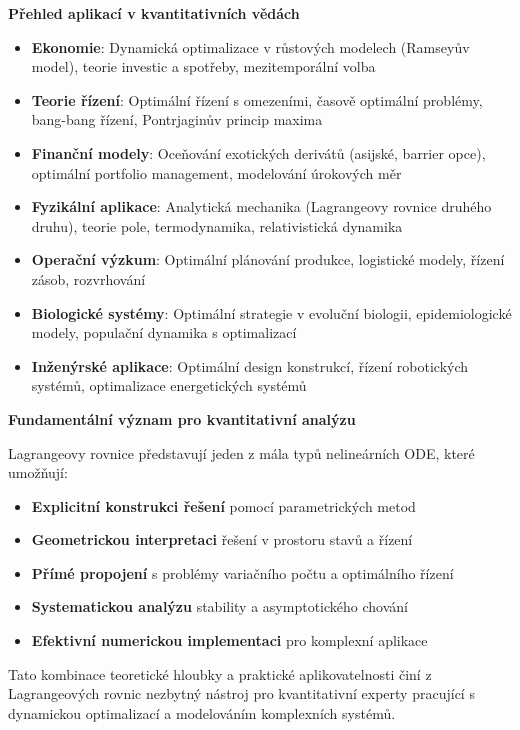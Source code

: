 \vspace{1\baselineskip}

\noindent\textbf{Přehled aplikací v kvantitativních vědách}

\begin{itemize}
\item \textbf{Ekonomie}: Dynamická optimalizace v růstových modelech (Ramseyův model), teorie investic a spotřeby, mezitemporální volba
\item \textbf{Teorie řízení}: Optimální řízení s omezeními, časově optimální problémy, bang-bang řízení, Pontrjaginův princip maxima
\item \textbf{Finanční modely}: Oceňování exotických derivátů (asijské, barrier opce), optimální portfolio management, modelování úrokových měr
\item \textbf{Fyzikální aplikace}: Analytická mechanika (Lagrangeovy rovnice druhého druhu), teorie pole, termodynamika, relativistická dynamika
\item \textbf{Operační výzkum}: Optimální plánování produkce, logistické modely, řízení zásob, rozvrhování
\item \textbf{Biologické systémy}: Optimální strategie v evoluční biologii, epidemiologické modely, populační dynamika s optimalizací
\item \textbf{Inženýrské aplikace}: Optimální design konstrukcí, řízení robotických systémů, optimalizace energetických systémů
\end{itemize}

\vspace{1\baselineskip}

\noindent\textbf{Fundamentální význam pro kvantitativní analýzu}

Lagrangeovy rovnice představují jeden z mála typů nelineárních ODE, které umožňují:
\begin{itemize}
\item \textbf{Explicitní konstrukci řešení} pomocí parametrických metod
\item \textbf{Geometrickou interpretaci} řešení v prostoru stavů a řízení
\item \textbf{Přímé propojení} s problémy variačního počtu a optimálního řízení
\item \textbf{Systematickou analýzu} stability a asymptotického chování
\item \textbf{Efektivní numerickou implementaci} pro komplexní aplikace
\end{itemize}

Tato kombinace teoretické hloubky a praktické aplikovatelnosti činí z Lagrangeových rovnic nezbytný nástroj pro kvantitativní experty pracující s dynamickou optimalizací a modelováním komplexních systémů.

